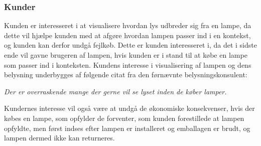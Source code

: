 \subsubsection{Kunder}
Kunden er interesseret i at visualisere hvordan lys udbreder sig fra en lampe, da dette vil hjælpe kunden med at afgøre hvordan lampen passer ind i en kontekst, og kunden kan derfor undgå fejlkøb. Dette er kunden interesseret i, da det i sidste ende vil gavne brugeren af lampen, hvis kunden er i stand til at købe en lampe som passer ind i konteksten. Kundens interesse i visualisering af lampen og dens belysning underbygges af følgende citat fra den førnævnte belysningskonsulent:
\begin{center}
\textit{Der er overraskende mange der gerne vil se lyset inden de køber lamper.}
\end{center}

Kundernes interesse vil også være at undgå de økonomiske konsekvenser, hvis der købes en lampe, som opfylder de forventer, som kunden forestillede at lampen opfyldte, men først indses efter lampen er installeret og emballagen er brudt, og lampen dermed ikke kan returneres.
